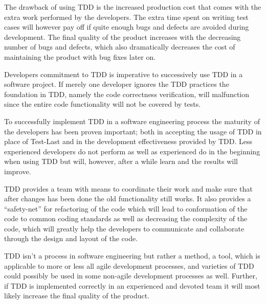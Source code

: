 The drawback of using TDD is the increased production cost that comes with the extra work performed by the developers. The extra time spent on writing test cases will however pay off if quite enough bugs and defects are avoided during development. The final quality of the product increases with the decreasing number of bugs and defects, which also dramatically decreases the cost of maintaining the product with bug fixes later on.

Developers commitment to TDD is imperative to successively use TDD in a software project. If merely one developer ignores the TDD practices the foundation in TDD, namely the code correctness verification, will malfunction since the entire code functionality will not be covered by tests.

To successfully implement TDD in a software engineering process the maturity of the developers has been proven important; both in accepting the usage of TDD in place of Test-Last and in the development effectiveness provided by TDD. Less experienced developers do not perform as well as experienced do in the beginning when using TDD but will, however, after a while learn and the results will improve.
  	
TDD provides a team with means to coordinate their work and make sure that after changes has been done the old functionality still works. It also provides a ``safety-net'' for refactoring of the code which will lead to conformation of the code to common coding standards as well as decreasing the complexity of the code, which will greatly help the developers to communicate and collaborate through the design and layout of the code.
	  	
TDD isn't a process in software engineering but rather a method, a tool, which is applicable to more or less all agile development processes, and varieties of TDD could possibly be used in some non-agile development processes as well. Further, if TDD is implemented correctly in an experienced and devoted team it will most likely increase the final quality of the product.  